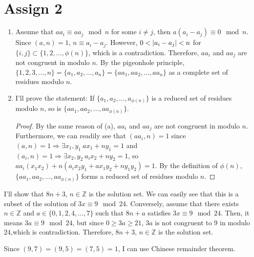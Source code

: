 \documentclass[12pt]{article}
\newenvironment{problem}[2][Problem]{\begin{trivlist}
\item[\hskip \labelsep {\bfseries #1}\hskip \labelsep {\bfseries #2.}]}{\end{trivlist}}
\begin{document}




\section{Assign 2}
\begin{problem}{1}
\end{problem}
\begin{enumerate}

    \item[(a)] Assume that $aa_i\equiv aa_j \mod n$ for some $i\neq j$, then $a(a_i-a_j)\equiv 0 \mod n$. Since $(a,n)=1$, $n\equiv a_i-a_j$. However, $0<\abs{a_i-a_j}<n$ for $\{i,j\}\subset \{1, 2, \ldots, \phi(n)\}$, which is a contradiction. Therefore, $aa_i$ and $aa_j$ are not congruent in modulo $n$. By the pigeonhole principle, $\{1,2,3,\ldots,n\}=\{a_1, a_2,\ldots, a_n\}=\{aa_1, aa_2, \ldots, aa_n\}$ as a complete set of residues modulo $n$.

    \item[(b)] I'll prove the statement: If $\{a_1, a_2, \ldots, a_{\phi(n)}\}$ is a reduced set of residues modulo $n$, so is $\{aa_1, aa_2, \ldots, aa_{\phi(n)}\}$.
    \begin{proof}
    By the same reason of (a), $aa_i$ and $aa_j$ are not congruent in modulo $n$. Furthermore, we can readily see that $(aa_i, n)=1$ since $(a,n)=1\Rightarrow \exists x_1,y_1~ax_1+ny_1=1$ and $(a_i, n)=1\Rightarrow \exists x_2, y_2~a_ix_2+ny_2=1$, so $aa_i(x_1x_2)+n(a_ix_2y_1+ax_1y_2+ny_1y_2)=1$. By the definition of $\phi(n)$, $\{aa_1, aa_2, \ldots, aa_{\phi(n)}\}$ forms a reduced set of residues modulo $n$.
    \end{proof} 
    
\end{enumerate}

\begin{problem}{2}
\end{problem}
I'll show that $8n+3$, $n\in \mathbb{Z}$ is the solution set. We can easily see that this is a subset of the solution of $3x\equiv 9 \mod 24$. Conversely, assume that there exists $n\in \mathbb{Z}$ and $a\in\{0, 1, 2, 4, \ldots, 7\}$ such that $8n+a$ satisfies $3x\equiv 9 \mod 24$. Then, it means $3a\equiv 9 \mod 24$, but since $0\geq 3a\geq 21$, $3a$ is not congruent to $9$ in modulo $24$,which is contradiction. Therefore, $8n+3$, $n\in \mathbb{Z}$ is the solution set.
\begin{problem}{3}
\end{problem}
Since $(9,7)=(9,5)=(7,5)=1$, I can use Chinese remainder theorem.
\end{document}
